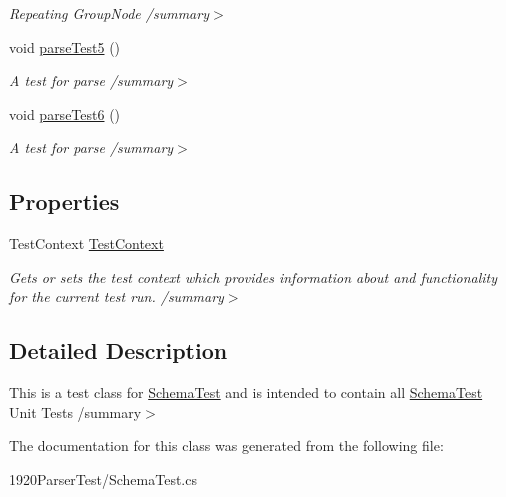 \begin{DoxyCompactItemize}
\begin{DoxyCompactList}\small\item\em Repeating Group\+Node /summary$>$ \end{DoxyCompactList}\item 
void \hyperlink{class__1920_parser_test_1_1_schema_test_ad23649d4c663d2e3dcb89248b7c020d6}{parse\+Test5} ()\hypertarget{class__1920_parser_test_1_1_schema_test_ad23649d4c663d2e3dcb89248b7c020d6}{}\label{class__1920_parser_test_1_1_schema_test_ad23649d4c663d2e3dcb89248b7c020d6}

\begin{DoxyCompactList}\small\item\em A test for parse /summary$>$ \end{DoxyCompactList}\item 
void \hyperlink{class__1920_parser_test_1_1_schema_test_a2b1ef3314565101371fcb29b22708c5e}{parse\+Test6} ()\hypertarget{class__1920_parser_test_1_1_schema_test_a2b1ef3314565101371fcb29b22708c5e}{}\label{class__1920_parser_test_1_1_schema_test_a2b1ef3314565101371fcb29b22708c5e}

\begin{DoxyCompactList}\small\item\em A test for parse /summary$>$ \end{DoxyCompactList}\end{DoxyCompactItemize}
\subsection*{Properties}
\begin{DoxyCompactItemize}
\item 
Test\+Context \hyperlink{class__1920_parser_test_1_1_schema_test_a2f92a3308526a2f070a7dd74dc2433e6}{Test\+Context}\hypertarget{class__1920_parser_test_1_1_schema_test_a2f92a3308526a2f070a7dd74dc2433e6}{}\label{class__1920_parser_test_1_1_schema_test_a2f92a3308526a2f070a7dd74dc2433e6}

\begin{DoxyCompactList}\small\item\em Gets or sets the test context which provides information about and functionality for the current test run. /summary$>$ \end{DoxyCompactList}\end{DoxyCompactItemize}


\subsection{Detailed Description}
This is a test class for \hyperlink{class__1920_parser_test_1_1_schema_test}{Schema\+Test} and is intended to contain all \hyperlink{class__1920_parser_test_1_1_schema_test}{Schema\+Test} Unit Tests /summary$>$ 

The documentation for this class was generated from the following file\+:\begin{DoxyCompactItemize}
\item 
1920\+Parser\+Test/Schema\+Test.\+cs\end{DoxyCompactItemize}

